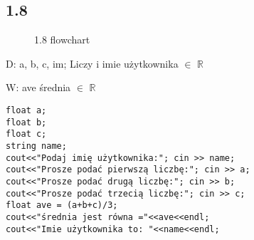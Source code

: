 \documentclass[a4paper,11pt]{article}
\begin{document}
\subsection*{1.8}
\begin{multicols}{2}
  \begin{flushleft}
    \begin{figure}[H]
    \centering  
{}
    \caption{1.8 flowchart}
    \label{flow8}
\end{figure}
    \end{flushleft}
 D: a, b, c, im; Liczy i imie użytkownika $\in$ $\mathbb{R}$
 
 W: ave średnia $\in$ $\mathbb{R}$
    \begin{flushright}
    \begin{verbatim}
float a;
float b;
float c;
string name;
cout<<"Podaj imię użytkownika:"; cin >> name;
cout<<"Prosze podać pierwszą liczbę:"; cin >> a;
cout<<"Prosze podać drugą liczbę:"; cin >> b;
cout<<"Prosze podać trzecią liczbę:"; cin >> c;
float ave = (a+b+c)/3;	
cout<<"średnia jest równa ="<<ave<<endl;
cout<<"Imie użytkownika to: "<<name<<endl;
\end{verbatim}
    \end{flushright}
\end{multicols}
\pagebreak
\end{document}
